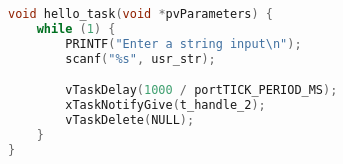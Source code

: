 \begin{lstlisting}[language=c,caption=Problem 1 Input Task, label=list:p1_task1]
void hello_task(void *pvParameters) {
    while (1) {
        PRINTF("Enter a string input\n");
        scanf("%s", usr_str);

        vTaskDelay(1000 / portTICK_PERIOD_MS);
        xTaskNotifyGive(t_handle_2);
        vTaskDelete(NULL);
    }
}
\end{lstlisting}
